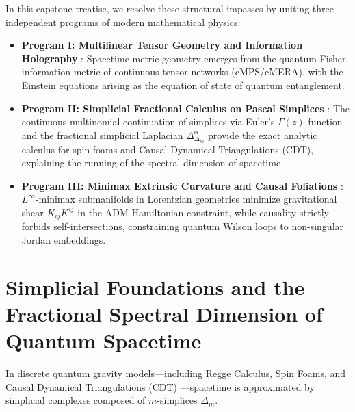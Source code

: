 \documentclass[11pt,a4paper,reqno]{amsart}
\theoremstyle{definition}
\numberwithin{equation}{section}
\begin{document}
In this capstone treatise, we resolve these structural impasses by uniting three independent programs of modern mathematical physics:
\begin{itemize}
    \item \textbf{Program I: Multilinear Tensor Geometry and Information Holography} \cite{turing2026beyond, turing2026flows, turing2026spacetime}: Spacetime metric geometry emerges from the quantum Fisher information metric of continuous tensor networks (cMPS/cMERA), with the Einstein equations arising as the equation of state of quantum entanglement.
    \item \textbf{Program II: Simplicial Fractional Calculus on Pascal Simplices} \cite{monarch2026pascal}: The continuous multinomial continuation of simplices via Euler's $\Gamma(z)$ function and the fractional simplicial Laplacian $\Delta_{\Delta_m}^\alpha$ provide the exact analytic calculus for spin foams and Causal Dynamical Triangulations (CDT), explaining the running of the spectral dimension of spacetime.
    \item \textbf{Program III: Minimax Extrinsic Curvature and Causal Foliations} \cite{monarch2026noneuclidean}: $L^\infty$-minimax submanifolds in Lorentzian geometries minimize gravitational shear $K_{ij}K^{ij}$ in the ADM Hamiltonian constraint, while causality strictly forbids self-intersections, constraining quantum Wilson loops to non-singular Jordan embeddings.
\end{itemize}

\section{Simplicial Foundations and the Fractional Spectral Dimension of Quantum Spacetime}
\label{sec:simplicial_fractional}

In discrete quantum gravity models—including Regge Calculus, Spin Foams, and Causal Dynamical Triangulations (CDT) \cite{ambjorn2005spectral}—spacetime is approximated by simplicial complexes composed of $m$-simplices $\Delta_m$.
\end{document}
